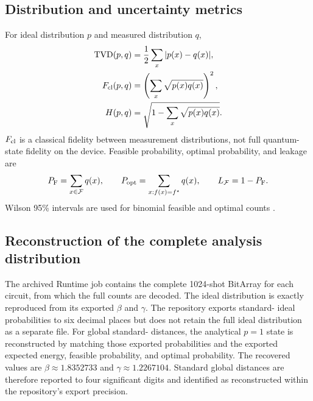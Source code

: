 \subsection{Distribution and uncertainty metrics}

For ideal distribution $p$ and measured distribution $q$,
\begin{align}
\operatorname{TVD}(p,q)&=\frac12\sum_x|p(x)-q(x)|,\label{eq:tvd}\\
F_{\mathrm{cl}}(p,q)&=\left(\sum_x\sqrt{p(x)q(x)}\right)^2,\label{eq:fidelity}\\
H(p,q)&=\sqrt{1-\sum_x\sqrt{p(x)q(x)}}.
\label{eq:hellinger}
\end{align}
$F_{\mathrm{cl}}$ is a classical fidelity between measurement distributions, not full quantum-state fidelity on the device. Feasible probability, optimal probability, and leakage are
\begin{equation}
P_{\mathrm{F}}=\sum_{x\in\mathcal F}q(x),
\qquad
P_{\mathrm{opt}}=\sum_{x:f(x)=f^\star}q(x),
\qquad
L_{\mathcal F}=1-P_{\mathrm{F}}.
\end{equation}
Wilson 95\% intervals are used for binomial feasible and optimal counts \cite{wilson1927}.

\subsection{Reconstruction of the complete analysis distribution}

The archived Runtime job contains the complete 1024-shot BitArray for each circuit, from which the full counts are decoded. The \GMQAOA{} ideal distribution is exactly reproduced from its exported $\beta$ and $\gamma$. The repository exports standard-\QAOA{} ideal probabilities to six decimal places but does not retain the full ideal distribution as a separate file. For global standard-\QAOA{} distances, the analytical $p=1$ state is reconstructed by matching those exported probabilities and the exported expected energy, feasible probability, and optimal probability. The recovered values are $\beta\approx1.8352733$ and $\gamma\approx1.2267104$. Standard global distances are therefore reported to four significant digits and identified as reconstructed within the repository's export precision.
